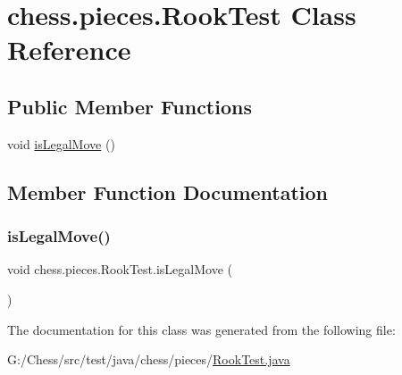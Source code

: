 \hypertarget{classchess_1_1pieces_1_1_rook_test}{}\section{chess.\+pieces.\+Rook\+Test Class Reference}
\label{classchess_1_1pieces_1_1_rook_test}
\subsection*{Public Member Functions}
\begin{DoxyCompactItemize}
\item 
void \mbox{\hyperlink{classchess_1_1pieces_1_1_rook_test_a6c91b6231443390374d477f75cc95f88}{is\+Legal\+Move}} ()
\end{DoxyCompactItemize}


\subsection{Member Function Documentation}
\mbox{\label{classchess_1_1pieces_1_1_rook_test_a6c91b6231443390374d477f75cc95f88}} 
\subsubsection{\texorpdfstring{is\+Legal\+Move()}{isLegalMove()}}
{\footnotesize\ttfamily void chess.\+pieces.\+Rook\+Test.\+is\+Legal\+Move (\begin{DoxyParamCaption}{ }\end{DoxyParamCaption})}



The documentation for this class was generated from the following file\+:\begin{DoxyCompactItemize}
\item 
G\+:/\+Chess/src/test/java/chess/pieces/\mbox{\hyperlink{_rook_test_8java}{Rook\+Test.\+java}}\end{DoxyCompactItemize}
